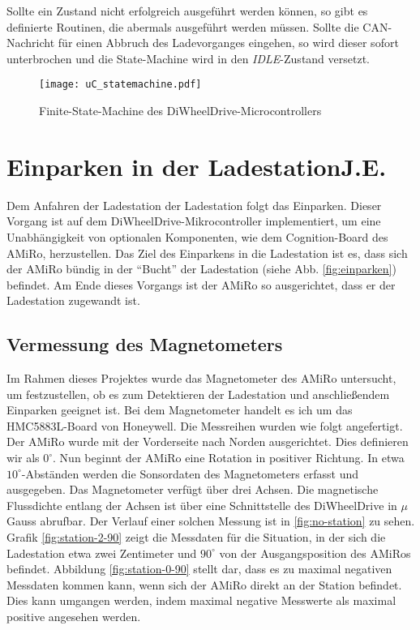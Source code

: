 Sollte ein Zustand nicht erfolgreich ausgeführt werden können, so gibt es definierte Routinen, die abermals ausgeführt werden müssen. Sollte die CAN-Nachricht für einen Abbruch des Ladevorganges eingehen, so wird dieser sofort unterbrochen und die State-Machine wird in den \textit{IDLE}-Zustand versetzt.

\begin{figure}[H]
	\begin{center}
		\texttt{[image: uC\_statemachine.pdf]} 	
		\caption{Finite-State-Machine des DiWheelDrive-Microcontrollers}
		\label{fig:uC_statmachine}
	\end{center}
\end{figure}

\section[Einparken in der Ladestation]{Einparken in der Ladestation\hfill {\normalsize J.E.}}\label{kap:einparken_ladestation} %
Dem Anfahren der Ladestation der Ladestation folgt das Einparken. Dieser Vorgang ist auf dem DiWheelDrive-Mikrocontroller implementiert, um eine Unabhängigkeit von optionalen Komponenten, wie dem Cognition-Board des AMiRo, herzustellen. Das Ziel des Einparkens in die Ladestation ist es, dass sich der AMiRo bündig in der ``Bucht'' der Ladestation (siehe Abb. \ref{fig:einparken}) befindet. Am Ende dieses Vorgangs ist der AMiRo so ausgerichtet, dass er der Ladestation zugewandt ist.

\subsection{Vermessung des Magnetometers}
Im Rahmen dieses Projektes wurde das Magnetometer des AMiRo untersucht, um festzustellen, ob es zum Detektieren der Ladestation und anschließendem Einparken geeignet ist.
Bei dem Magnetometer handelt es ich um das HMC5883L-Board von Honeywell.
Die Messreihen wurden wie folgt angefertigt. Der AMiRo wurde mit der Vorderseite nach Norden ausgerichtet. Dies definieren wir als $0^\circ$. Nun beginnt der AMiRo eine Rotation in positiver Richtung. In etwa $10^\circ$-Abständen werden die Sonsordaten des Magnetometers erfasst und ausgegeben. Das Magnetometer verfügt über drei Achsen. Die magnetische Flussdichte entlang der Achsen ist über eine Schnittstelle des DiWheelDrive in $\mu$Gauss abrufbar. Der Verlauf einer solchen Messung ist in \ref{fig:no-station} zu sehen.
Grafik \ref{fig:station-2-90} zeigt die Messdaten für die Situation, in der sich die Ladestation etwa zwei Zentimeter und $90^\circ$ von der Ausgangsposition des AMiRos befindet.
Abbildung \ref{fig:station-0-90} stellt dar, dass es zu maximal negativen Messdaten kommen kann, wenn sich der AMiRo direkt an der Station befindet. Dies kann umgangen werden, indem maximal negative Messwerte als maximal positive angesehen werden.

